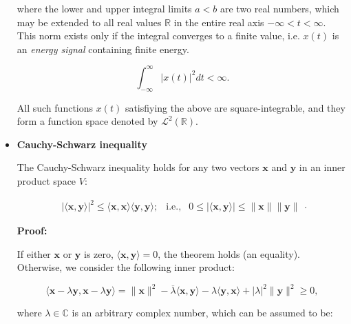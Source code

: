 \documentclass[10pt,b5paper,titlepage]{book}
\begin{document}
\begin{itemize}
        where the lower and upper integral limits $a < b$ are two real
        numbers, which may be extended to all real values  $\mathbb{R}$
        in the entire real axis $-\infty < t < \infty$. This norm exists
        only if the integral converges to a finite value, i.e. $x(t)$
        is an  \textit{energy signal} containing finite energy.

        \begin{equation}
            \int_{-\infty}^{\infty} |x(t)|^{2} dt < \infty
        .\end{equation}

        All such functions $x(t)$ satisfiying the above are square-integrable,
        and they form a function space denoted by $\mathcal{L}^{2}(\mathbb{R})$.

    \item \textbf{Cauchy-Schwarz inequality}

        The Cauchy-Schwarz inequality holds for any two vectors $\mathbf{x}$
        and $\mathbf{y}$ in an inner product space $V$:

        \begin{equation}
            \begin{array}{lcr}
                | \langle \mathbf{x}, \mathbf{y} \rangle |^{2}
                \le \langle \mathbf{x}, \mathbf{x} \rangle
                \langle \mathbf{y}, \mathbf{y} \rangle; &
                \text{i.e.,} &
                0 \le  | \langle \mathbf{x}, \mathbf{y} \rangle |
                \le \|\mathbf{x}\| \|\mathbf{y}\|
            \end{array}
        .\end{equation}

        \textbf{Proof:}

        If either $\mathbf{x}$ or $\mathbf{y}$ is zero,
        $\langle \mathbf{x}, \mathbf{y} \rangle = 0$, the theorem holds
        (an equality). Otherwise, we consider the following inner product:

        \begin{equation}
            \langle \mathbf{x} - \lambda \mathbf{y}, \mathbf{x} - \lambda \mathbf{y} \rangle
            = \|\mathbf{x}\|^{2}
            - \overline{\lambda} \langle \mathbf{x}, \mathbf{y} \rangle
            - \lambda \langle \mathbf{y}, \mathbf{x} \rangle
            + |\lambda|^{2} \|\mathbf{y}\|^{2}
            \ge 0
        ,\end{equation}

        where $\lambda \in \mathbb{C}$ is an arbitrary complex number, which
        can be assumed to be:


\end{itemize}
\end{document}
